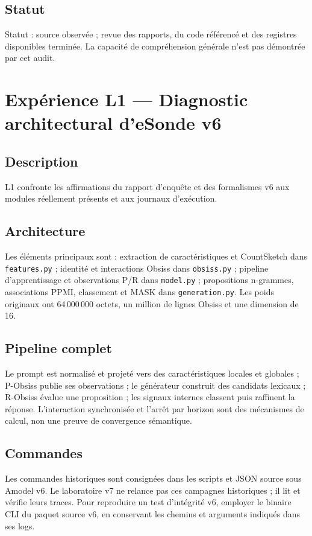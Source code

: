 \documentclass[11pt,a4paper]{report}
\begin{document}
\section{Statut}
Statut : source observée ; revue des rapports, du code référencé et des registres disponibles terminée. La capacité de compréhension générale n'est pas démontrée par cet audit.

\chapter{Expérience L1 — Diagnostic architectural d'eSonde v6}
\section{Description}
L1 confronte les affirmations du rapport d'enquête et des formalismes v6 aux modules réellement présents et aux journaux d'exécution.
\section{Architecture}
Les éléments principaux sont : extraction de caractéristiques et CountSketch dans \texttt{features.py} ; identité et interactions Obsiss dans \texttt{obsiss.py} ; pipeline d'apprentissage et observations P/R dans \texttt{model.py} ; propositions n-grammes, associations PPMI, classement et MASK dans \texttt{generation.py}. Les poids originaux ont 64\,000\,000 octets, un million de lignes Obsiss et une dimension de 16.
\section{Pipeline complet}
Le prompt est normalisé et projeté vers des caractéristiques locales et globales ; P-Obsiss publie ses observations ; le générateur construit des candidats lexicaux ; R-Obsiss évalue une proposition ; les signaux internes classent puis raffinent la réponse. L'interaction synchronisée et l'arrêt par horizon sont des mécanismes de calcul, non une preuve de convergence sémantique.
\section{Commandes}
Les commandes historiques sont consignées dans les scripts et JSON source sous Amodel v6. Le laboratoire v7 ne relance pas ces campagnes historiques ; il lit et vérifie leurs traces. Pour reproduire un test d'intégrité v6, employer le binaire CLI du paquet source v6, en conservant les chemins et arguments indiqués dans ses logs.
\end{document}
